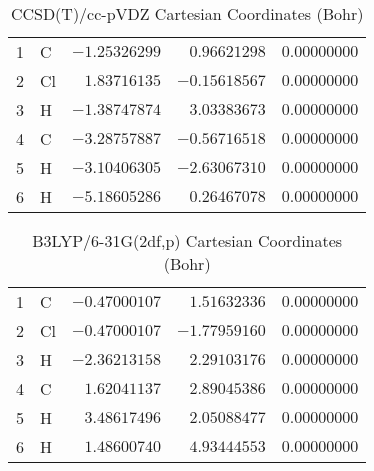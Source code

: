\documentclass[10pt,oneside]{article}
\begin{document}
\begin{table}[h!]
\centering
\caption{CCSD(T)/cc-pVDZ Cartesian Coordinates (Bohr)}
\begin{tabular}{llrrr}
1  & C  & $-1.25326299$ & $ 0.96621298$ & $ 0.00000000$ \\
2  & Cl & $ 1.83716135$ & $-0.15618567$ & $ 0.00000000$ \\
3  & H  & $-1.38747874$ & $ 3.03383673$ & $ 0.00000000$ \\
4  & C  & $-3.28757887$ & $-0.56716518$ & $ 0.00000000$ \\
5  & H  & $-3.10406305$ & $-2.63067310$ & $ 0.00000000$ \\
6  & H  & $-5.18605286$ & $ 0.26467078$ & $ 0.00000000$ \\
\end{tabular}
\end{table}

\begin{table}[h!]
\centering
\caption{B3LYP/6-31G(2df,p) Cartesian Coordinates (Bohr)}
\begin{tabular}{llrrr}
1  & C  & $-0.47000107$ & $ 1.51632336$ & $ 0.00000000$ \\
2  & Cl & $-0.47000107$ & $-1.77959160$ & $ 0.00000000$ \\
3  & H  & $-2.36213158$ & $ 2.29103176$ & $ 0.00000000$ \\
4  & C  & $ 1.62041137$ & $ 2.89045386$ & $ 0.00000000$ \\
5  & H  & $ 3.48617496$ & $ 2.05088477$ & $ 0.00000000$ \\
6  & H  & $ 1.48600740$ & $ 4.93444553$ & $ 0.00000000$ \\
\end{tabular}
\end{table}

\clearpage
\end{document}
